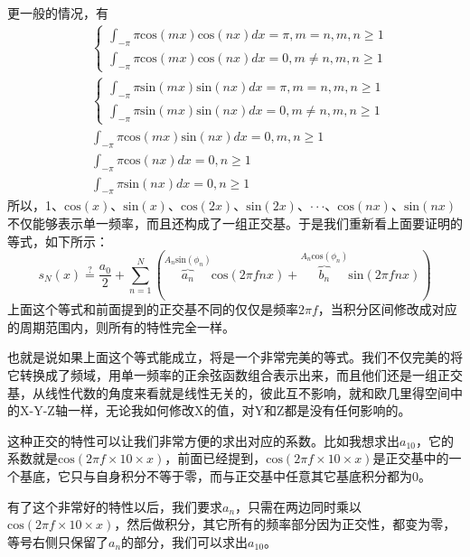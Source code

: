 \documentclass[lang=cn,11pt,a4paper,cite=numbers]{elegantpaper}
\begin{document}
  更一般的情况，有
\begin{equation}
  \begin{aligned}
    &\begin{cases}
      \int_{-\pi}{\pi}\mathrm{cos}(mx)\mathrm{cos}(nx)dx=\pi, m=n,m,n{\geq}1\\
      \int_{-\pi}{\pi}\mathrm{cos}(mx)\mathrm{cos}(nx)dx=0, m{\neq}n,m,n{\geq}1
    \end{cases}\\
    &\begin{cases}
      \int_{-\pi}{\pi}\mathrm{sin}(mx)\mathrm{sin}(nx)dx=\pi, m=n,m,n{\geq}1\\
      \int_{-\pi}{\pi}\mathrm{sin}(mx)\mathrm{sin}(nx)dx=0, m{\neq}n,m,n{\geq}1
    \end{cases}\\
    &\int_{-\pi}{\pi}\mathrm{cos}(mx)\mathrm{sin}(nx)dx=0, m,n{\geq}1\\
    &\int_{-\pi}{\pi}\mathrm{cos}(nx)dx=0, n{\geq}1\\
    &\int_{-\pi}{\pi}\mathrm{sin}(nx)dx=0, n{\geq}1
  \end{aligned}
\end{equation}
所以，1、$\mathrm{cos}(x)$、$\mathrm{sin}(x)$、$\mathrm{cos}(2x)$、$\mathrm{sin}(2x)$、$\cdot\cdot\cdot$、$\mathrm{cos}(nx)$、$\mathrm{sin}(nx)$不仅能够表示单一频率，而且还构成了一组正交基。于是我们重新看上面要证明的等式，如下所示：
\begin{equation}
  s_{N}(x)\overset{?}{=}\frac{a_{0}}{2}+\sum_{n=1}^{N}\left(\overbrace{a_{n}}^{A_{n}\mathrm{sin}(\phi_{n})}\mathrm{cos}(2{\pi}fnx)+\overbrace{b_{n}}^{A_{n}\mathrm{cos}(\phi_{n})}\mathrm{sin}(2{\pi}fnx)\right)
\end{equation}
上面这个等式和前面提到的正交基不同的仅仅是频率$2{\pi}f$，当积分区间修改成对应的周期范围内，则所有的特性完全一样。

  也就是说如果上面这个等式能成立，将是一个非常完美的等式。我们不仅完美的将它转换成了频域，用单一频率的正余弦函数组合表示出来，而且他们还是一组正交基，从线性代数的角度来看就是线性无关的，彼此互不影响，就和欧几里得空间中的X-Y-Z轴一样，无论我如何修改X的值，对Y和Z都是没有任何影响的。

  这种正交的特性可以让我们非常方便的求出对应的系数。比如我想求出$a_{10}$，它的系数就是$\mathrm{cos}(2{\pi}f{\times}10{\times}x)$，前面已经提到，$\mathrm{cos}(2{\pi}f{\times}10{\times}x)$是正交基中的一个基底，它只与自身积分不等于零，而与正交基中任意其它基底积分都为0。

  有了这个非常好的特性以后，我们要求$a_{n}$，只需在两边同时乘以$\mathrm{cos}(2{\pi}f{\times}10{\times}x)$，然后做积分，其它所有的频率部分因为正交性，都变为零，等号右侧只保留了$a_{n}$的部分，我们可以求出$a_{10}$。
\end{document}
